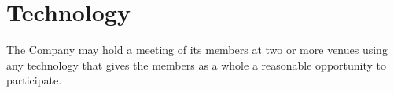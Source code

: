 \section{Technology}

The Company may hold a meeting of its members at two or more venues using any technology that gives the members as a whole a reasonable opportunity to participate. 